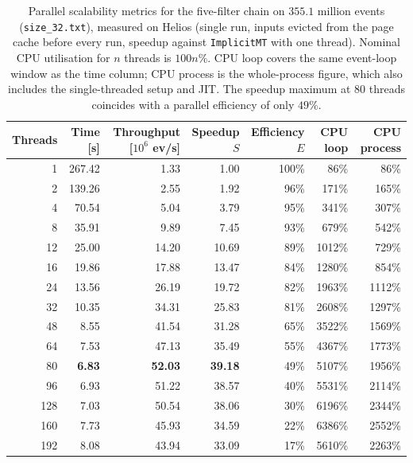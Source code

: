 \begin{table}[htbp]
\centering
\caption{Parallel scalability metrics for the five-filter chain on $355.1$ million events (\texttt{size\_32.txt}), measured on Helios (single run, inputs evicted from the page cache before every run, speedup against \texttt{ImplicitMT} with one thread). Nominal CPU utilisation for $n$ threads is $100n\%$. CPU loop covers the same event-loop window as the time column; CPU process is the whole-process figure, which also includes the single-threaded setup and JIT. The speedup maximum at 80 threads coincides with a parallel efficiency of only $49\%$.}
\label{tab:scalability-chain}
\begin{tabular}{rrrrrrr}
\toprule
Threads & Time [s] & Throughput [$10^6$ ev/s] & Speedup $S$ & Efficiency $E$ & CPU loop & CPU process \\
\midrule
 1 & 267.42 & 1.33 & 1.00 & 100\% & 86\% & 86\% \\
 2 & 139.26 & 2.55 & 1.92 & 96\% & 171\% & 165\% \\
 4 & 70.54 & 5.04 & 3.79 & 95\% & 341\% & 307\% \\
 8 & 35.91 & 9.89 & 7.45 & 93\% & 679\% & 542\% \\
12 & 25.00 & 14.20 & 10.69 & 89\% & 1012\% & 729\% \\
16 & 19.86 & 17.88 & 13.47 & 84\% & 1280\% & 854\% \\
24 & 13.56 & 26.19 & 19.72 & 82\% & 1963\% & 1112\% \\
32 & 10.35 & 34.31 & 25.83 & 81\% & 2608\% & 1297\% \\
48 & 8.55 & 41.54 & 31.28 & 65\% & 3522\% & 1569\% \\
64 & 7.53 & 47.13 & 35.49 & 55\% & 4367\% & 1773\% \\
80 & \textbf{6.83} & \textbf{52.03} & \textbf{39.18} & 49\% & 5107\% & 1956\% \\
96 & 6.93 & 51.22 & 38.57 & 40\% & 5531\% & 2114\% \\
128 & 7.03 & 50.54 & 38.06 & 30\% & 6196\% & 2344\% \\
160 & 7.73 & 45.93 & 34.59 & 22\% & 6386\% & 2552\% \\
192 & 8.08 & 43.94 & 33.09 & 17\% & 5610\% & 2263\% \\
\bottomrule
\end{tabular}
\end{table}
